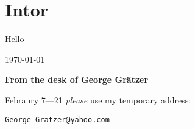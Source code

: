 \documentclass{sample}
\begin{document}
    \section{Intor}{
        Hello
    }
    \begin{flushright}
        \today
    \end{flushright}
    \textbf{From the desk of George Gr\"{a}tzer}

    Febraury 7---21 \emph{please} use my temporary address:
    \begin{center}
        \texttt{George\_Gratzer@yahoo.com}
    \end{center}
\end{document}
